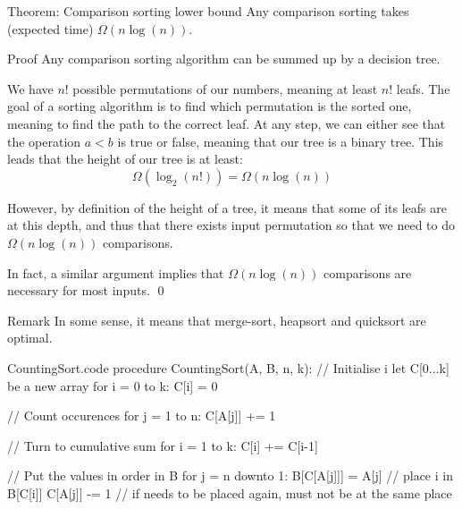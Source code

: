 \documentclass[a4paper]{article}
\begin{document}
\begin{parag}{Theorem: Comparison sorting lower bound}
    Any comparison sorting takes (expected time) $\Omega\left(n\log\left(n\right)\right)$.

    \begin{subparag}{Proof}
        Any comparison sorting algorithm can be summed up by a decision tree. 

        We have $n!$ possible permutations of our numbers, meaning at least $n!$ leafs. The goal of a sorting algorithm is to find which permutation is the sorted one, meaning to find the path to the correct leaf. At any step, we can either see that the operation $a < b$ is true or false, meaning that our tree is a binary tree. This leads that the height of our tree is at least: 
        \[\Omega\left(\log_2\left(n!\right)\right) = \Omega\left(n\log\left(n\right)\right)\]
        
        However, by definition of the height of a tree, it means that some of its leafs are at this depth, and thus that there exists input permutation so that we need to do $\Omega\left(n\log\left(n\right)\right)$ comparisons.

        In fact, a similar argument implies that $\Omega\left(n\log\left(n\right)\right)$ comparisons are necessary for most inputs.
        \qed
    \end{subparag}
    

    \begin{subparag}{Remark}
        In some sense, it means that merge-sort, heapsort and quicksort are optimal.
    \end{subparag}
\end{parag}

\begin{filecontents*}[overwrite]{CountingSort.code}
procedure CountingSort(A, B, n, k):
    // Initialise i
    let C[0...k] be a new array
    for i = 0 to k:
        C[i] = 0
    
    // Count occurences
    for j = 1 to n:
        C[A[j]] += 1

    // Turn to cumulative sum
    for i = 1 to k:
        C[i] += C[i-1]

    // Put the values in order in B
    for j = n downto 1:
        B[C[A[j]]] = A[j]  // place i in B[C[i]]
        C[A[j]] -= 1  // if needs to be placed again, must not be at the same place
\end{filecontents*}
\end{document}
